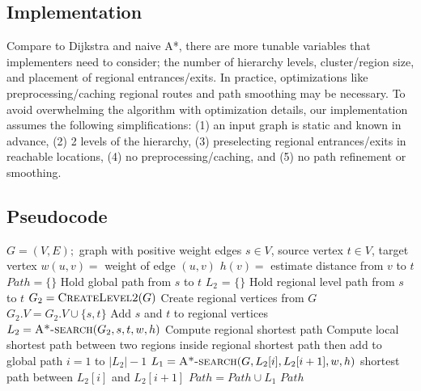 \documentclass{article}
\begin{document}
\subsection{Implementation}
Compare to Dijkstra and naive A*, there are more tunable variables that implementers need to consider; the number of hierarchy levels, cluster/region size, and placement of regional entrances/exits. In practice, optimizations like preprocessing/caching regional routes and path smoothing may be necessary.
To avoid overwhelming the algorithm with optimization details, our implementation assumes the following simplifications: (1) an input graph is static and known in advance, (2) 2 levels of the hierarchy, (3) preselecting regional entrances/exits in reachable locations, (4) no preprocessing/caching, and (5) no path refinement or smoothing.


\subsection{Pseudocode}
\begin{codebox}
\li \Comment $G = (V,E);$ graph with positive weight edges
\li \Comment $s \in V$, source vertex
\li \Comment $t \in V$, target vertex
\li \Comment $w(u,v) = $ weight of edge $(u,v)$
\li \Comment $h(v) = $ estimate distance from $v$ to $t$  
\li
\li $Path = \{\}$   \hspace{3cm}\Comment Hold global path from $s$ to $t$
\li $L_2$ = $\{\}$  \hspace{3.4cm}\Comment Hold regional level path from $s$ to $t$ 
\li $G_2 = \textsc{CreateLevel2}(G)$ \hspace{0.7cm}\Comment Create regional vertices from $G$
\li $G_2.V = G_2.V \cup \{s, t\}$   \hspace{1.4cm}\Comment Add $s$ and $t$ to regional vertices
\li
\li $L_2 = \textsc{A*-search}(G_2,s,t,w,h)$     \hspace{0.5cm}\Comment Compute regional shortest path
\li
\li \Comment Compute local shortest path between two regions inside regional shortest path
\li \Comment then add to global path
\li \For $i = 1$ to $|L_2| - 1$
\li     \Do
            $L_1 = \textsc{A*-search}(G,L_2[i],L_2[i+1],w,h)$ \hspace{0.5cm}\Comment shortest path between $L_2[i]$ and $L_2[i+1]$
\li         $Path = Path \cup L_1$
        \End
\li 
\li \Return $Path$
\end{codebox}
\end{document}
